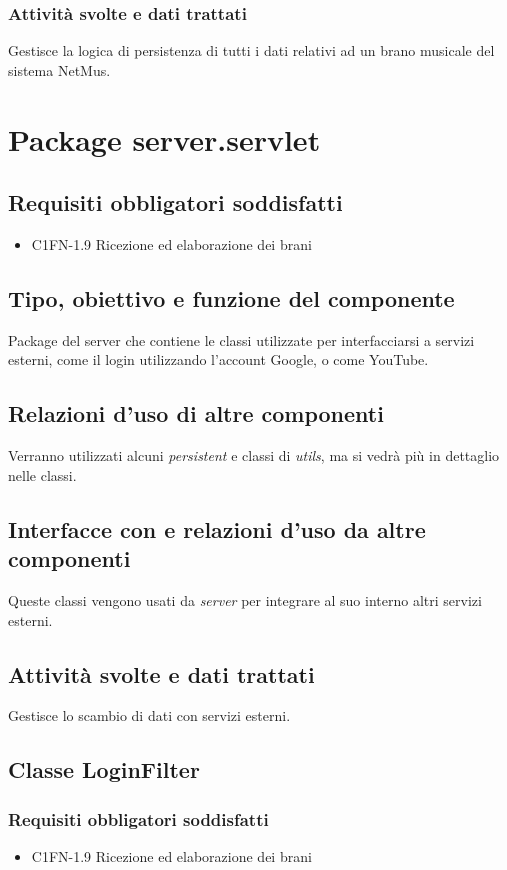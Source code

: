 \subsubsection*{Attivit\`a svolte e dati trattati} Gestisce
la logica di persistenza di tutti i dati relativi ad un brano musicale del
sistema NetMus.

\newpage
\section{Package server.servlet}
\subsection*{Requisiti obbligatori soddisfatti}
\begin{itemize}
	\item C1FN-1.9 Ricezione ed elaborazione dei brani
\end{itemize}
\subsection*{Tipo, obiettivo e funzione del componente}
Package del server che contiene le classi utilizzate per interfacciarsi a
servizi esterni, come il login utilizzando l'account Google, o come YouTube.

\subsection*{Relazioni d'uso di altre componenti}
Verranno utilizzati alcuni \emph{persistent} e classi di \emph{utils}, ma
si vedr\`a pi\`u in dettaglio nelle classi.

\subsection*{Interfacce con e relazioni d'uso da altre componenti}
Queste classi vengono usati da \emph{server} per integrare al suo interno
altri servizi esterni.
\subsection*{Attivit\`a svolte e dati trattati}
Gestisce lo scambio di dati con servizi esterni.

\subsection{Classe LoginFilter}
\subsubsection*{Requisiti obbligatori soddisfatti}
\begin{itemize}
	\item C1FN-1.9 Ricezione ed elaborazione dei brani
\end{itemize}
